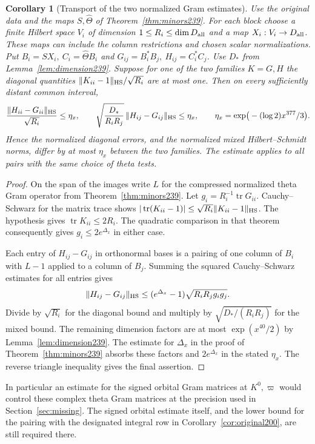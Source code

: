 \documentclass[a4paper,11pt]{article}
\newtheorem{corollary}[proposition]{Corollary}
\theoremstyle{definition}
\theoremstyle{remark}
\numberwithin{equation}{section}
\begin{document}
\begin{corollary}[Transport of the two normalized Gram estimates]
\label{cor:blocks239}
Use the original data and the maps \(S,\widehat\Theta\) of
Theorem~\ref{thm:minors239}. For each block choose a finite
Hilbert space \(V_i\) of dimension \(1\le R_i\le\dim D_{\rm all}\)
and a map \(X_i:V_i\to D_{\rm all}\). These maps can include
the column restrictions and chosen scalar normalizations.
Put \(B_i=SX_i,\ C_i=\widehat\Theta B_i\) and
\(G_{ij}=B_i^*B_j,\ H_{ij}=C_i^*C_j\). Use \(D_*\) from
Lemma~\ref{lem:dimension239}. Suppose for one of the two families
\(K=G,H\) the diagonal quantities
\(\|K_{ii}-1\|_{\rm HS}/\sqrt{R_i}\) are at most one.
Then on every sufficiently distant common interval,
\[
 \frac{\|H_{ii}-G_{ii}\|_{\rm HS}}{\sqrt{R_i}}\le\eta_x,
 \qquad
 \sqrt{\frac{D_*}{R_iR_j}}\,\|H_{ij}-G_{ij}\|_{\rm HS}
       \le\eta_x,\qquad
 \eta_x=\exp\!\big(-(\log 2)x^{377}/3\big).
\]
Hence the normalized diagonal errors, and the normalized mixed
Hilbert--Schmidt norms, differ by at most \(\eta_x\) between the
two families. The estimate applies to all pairs with the same
choice of theta tests.
\end{corollary}
\begin{proof}
On the span of the images write \(L\) for the compressed
normalized theta Gram operator from Theorem~\ref{thm:minors239}.
Let \(g_i=R_i^{-1}\operatorname{tr}G_{ii}\).
Cauchy--Schwarz for the matrix trace shows
\(|\operatorname{tr}(K_{ii}-1)|\le\sqrt{R_i}\|K_{ii}-1\|_{\rm HS}\).
The hypothesis gives \(\operatorname{tr}K_{ii}\le2R_i\).
The quadratic comparison in that theorem consequently gives
\(g_i\le2e^{\Delta_x}\) in either case.

Each entry of \(H_{ij}-G_{ij}\) in orthonormal bases is a
pairing of one column of \(B_i\) with \(L-1\) applied to a
column of \(B_j\). Summing the squared Cauchy--Schwarz estimates
for all entries gives
\[
   \|H_{ij}-G_{ij}\|_{\rm HS}
       \le (e^{\Delta_x}-1)\sqrt{R_iR_jg_ig_j}.
\]
Divide by \(\sqrt{R_i}\) for the diagonal bound and multiply
by \(\sqrt{D_*/(R_iR_j)}\) for the mixed bound.
The remaining dimension factors are at most \(\exp(x^{40}/2)\)
by Lemma~\ref{lem:dimension239}. The estimate for \(\Delta_x\)
in the proof of Theorem~\ref{thm:minors239} absorbs these factors
and \(2e^{\Delta_x}\) in the stated \(\eta_x\).
The reverse triangle inequality gives the final assertion.
\end{proof}

In particular an estimate for the signed orbital Gram matrices
at \(K^0,\varpi\) would control these complex theta Gram matrices
at the precision used in Section~\ref{sec:missing}. The signed
orbital estimate itself, and the lower bound for the pairing
with the designated integral row in Corollary~\ref{cor:original200},
are still required there.
\end{document}
